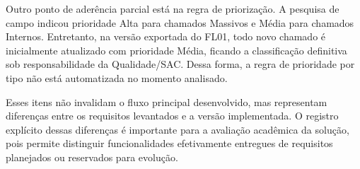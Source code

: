 Outro ponto de aderência parcial está na regra de
priorização. A pesquisa de campo indicou prioridade Alta
para chamados Massivos e Média para chamados Internos.
Entretanto, na versão exportada do FL01, todo novo chamado
é inicialmente atualizado com prioridade Média, ficando a
classificação definitiva sob responsabilidade da
Qualidade/SAC. Dessa forma, a regra de prioridade por tipo
não está automatizada no momento analisado.

Esses itens não invalidam o fluxo principal desenvolvido,
mas representam diferenças entre os requisitos levantados
e a versão implementada. O registro explícito dessas
diferenças é importante para a avaliação acadêmica da
solução, pois permite distinguir funcionalidades
efetivamente entregues de requisitos planejados ou
reservados para evolução.
